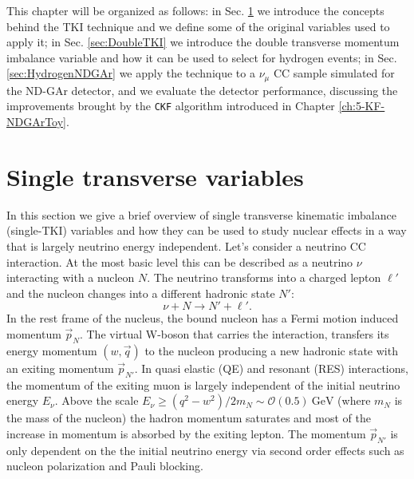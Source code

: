 This chapter will be organized as follows: in Sec. \ref{sec:SingleTKI} we introduce the concepts behind the TKI technique and we define some of the original variables used to apply it; in Sec. \ref{sec:DoubleTKI} we introduce the double transverse momentum imbalance variable and how it can be used to select for hydrogen events; in Sec. \ref{sec:HydrogenNDGAr} we apply the technique to a $\nu_\mu$ CC sample simulated for the ND-GAr detector, and we evaluate the detector performance, discussing the improvements brought by the \texttt{\texttt{CKF}} algorithm introduced in Chapter \ref{ch:5-KF-NDGArToy}.


\section{Single transverse variables}
\label{sec:SingleTKI}
In this section we give a brief overview of single transverse kinematic imbalance (single-TKI) variables and how they can be used to study nuclear effects in a way that is largely neutrino energy independent. Let's consider a neutrino CC interaction. At the most basic level this can be described as a neutrino $\nu$ interacting with a nucleon $N$. The neutrino transforms into a charged lepton $\ell'$ and the nucleon changes into a different hadronic state $N'$:
\begin{equation}
    \nu+N\rightarrow N'+\ell'.
\end{equation}
In the rest frame of the nucleus, the bound nucleon has a Fermi motion induced momentum $\Vec{p}_N$. The virtual W-boson that carries the interaction, transfers its energy momentum $(w,\Vec{q})$ to the nucleon producing a new hadronic state with an exiting momentum $\Vec{p}_{N'}$. In quasi elastic (QE) and resonant (RES) interactions, the momentum of the exiting muon is largely independent of the initial neutrino energy $E_\nu$. Above the scale $E_\nu\geq(q^2-w^2)/2m_N\sim\mathcal{O}(0.5)\  \text{GeV}$ (where $m_N$ is the mass of the nucleon) the hadron momentum saturates and most of the increase in momentum is absorbed by the exiting lepton. The momentum $\Vec{p}_{N'}$ is only dependent on the the initial neutrino energy via second order effects such as nucleon polarization and Pauli blocking. 

